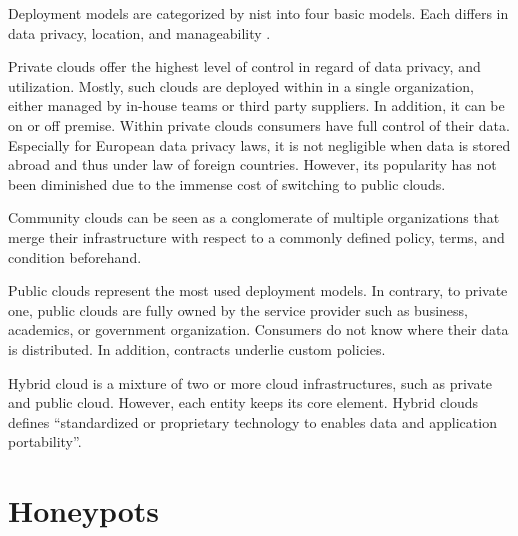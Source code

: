 Deployment models are categorized by \ac{nist} into four basic models.
Each differs in data privacy, location, and manageability \cite{Mell2011}.

Private clouds offer the highest level of control in regard of data privacy, and utilization. Mostly, such clouds are deployed within in a single organization, either managed by in-house teams or third party suppliers.
In addition, it can be on or off premise.
Within private clouds consumers have full control of their data.
Especially for European data privacy laws, it is not negligible when data is stored abroad and thus under law of foreign countries.
However, its popularity has not been diminished due to the immense cost of switching to public clouds. \cite{Dillon2010, Mell2011}

Community clouds can be seen as a conglomerate of multiple organizations that merge their infrastructure with respect to a commonly defined policy, terms, and condition beforehand. \cite{Mell2011}

Public clouds represent the most used deployment models.
In contrary, to private one, public clouds are fully owned by the service provider such as business, academics, or government organization.
Consumers do not know where their data is distributed.
In addition, contracts underlie custom policies. \cite{Mell2011}

Hybrid cloud is a mixture of two or more cloud infrastructures, such as private and public cloud.
However, each entity keeps its core element.
Hybrid clouds defines \enquote{standardized or proprietary technology to enables data and application portability}\cite{Mell2011}.

\section{Honeypots}

